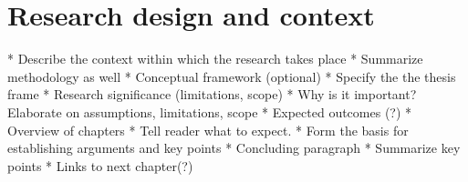 \section{Research design and context}
\ifIncludeWritingTips
\begin{markdown}
    * Describe the context within which the research takes place
    * Summarize methodology as well
* Conceptual framework (optional)
    * Specify the the thesis frame
* Research significance (limitations, scope)
    * Why is it important? Elaborate on assumptions, limitations, scope
* Expected outcomes (?)
* Overview of chapters
    * Tell reader what to expect.
    * Form the basis for establishing arguments and key points
* Concluding paragraph
    * Summarize key points
    * Links to next chapter(?)
\end{markdown}
\fi

